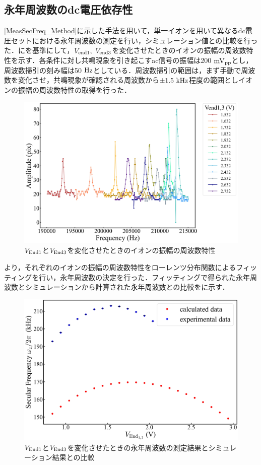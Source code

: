 \clearpage

\subsection{永年周波数のdc電圧依存性}
\ref{MeasSecFreq_Method}に示した手法を用いて，単一イオンを用いて異なるdc電圧セットにおける永年周波数の測定を行い，シミュレーション値との比較を行った．にを基準にして，$V_{\rm end1}, \ V_{\rm end3}$を変化させたときのイオンの振幅の周波数特性を示す．各条件に対し共鳴現象を引き起こすac信号の振幅は200$\ {\rm mV_{pp}}$とし，周波数掃引の刻み幅は50$\ {\rm Hz}$としている．周波数掃引の範囲は，まず手動で周波数を変化させ，共鳴現象が確認される周波数から$\pm1.5 \ {\rm kHz}$程度の範囲としイオンの振幅の周波数特性の取得を行った．

\begin{figure}[h]
	\begin{center}
		\includegraphics[width = 0.6\linewidth]{./results/figure/end13-SecFreq.jpg}
		\caption{$V_{\rm End1}$と$V_{\rm End3}$を変化させたときのイオンの振幅の周波数特性}
		\label{fig:end13_MeasSec}
	\end{center}
\end{figure}

より，それぞれのイオンの振幅の周波数特性をローレンツ分布関数によるフィッティングを行い，永年周波数の決定を行った．フィッティングで得られた永年周波数とシミュレーションから計算された永年周波数との比較をに示す．

\begin{figure}[h]
	\begin{center}
		\includegraphics[width = 0.6\linewidth]{./results/figure/Vend13-SecFreqZ.jpg}
		\caption{$V_{\rm End1}$と$V_{\rm End3}$を変化させたときの永年周波数の測定結果とシミュレーション結果との比較}
		\label{fig:end13_MeasSec_SimSec}
	\end{center}
\end{figure}

